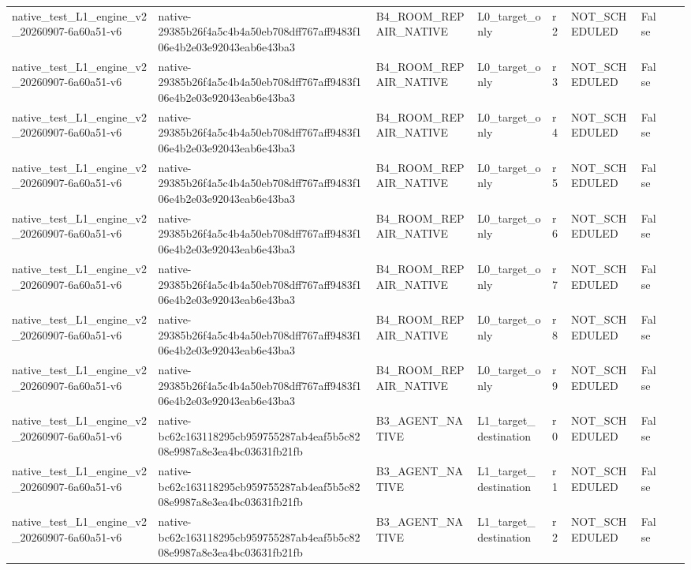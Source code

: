 \begin{tabular}{lllllllll}
native\_test\_L1\_engine\_v2\_20260907-6a60a51-v6 & native-29385b26f4a5c4b4a50eb708dff767aff9483f106e4b2e03e92043eab6e43ba3 & B4\_ROOM\_REPAIR\_NATIVE & L0\_target\_only & r2 & NOT\_SCHEDULED & False &  &  \\
native\_test\_L1\_engine\_v2\_20260907-6a60a51-v6 & native-29385b26f4a5c4b4a50eb708dff767aff9483f106e4b2e03e92043eab6e43ba3 & B4\_ROOM\_REPAIR\_NATIVE & L0\_target\_only & r3 & NOT\_SCHEDULED & False &  &  \\
native\_test\_L1\_engine\_v2\_20260907-6a60a51-v6 & native-29385b26f4a5c4b4a50eb708dff767aff9483f106e4b2e03e92043eab6e43ba3 & B4\_ROOM\_REPAIR\_NATIVE & L0\_target\_only & r4 & NOT\_SCHEDULED & False &  &  \\
native\_test\_L1\_engine\_v2\_20260907-6a60a51-v6 & native-29385b26f4a5c4b4a50eb708dff767aff9483f106e4b2e03e92043eab6e43ba3 & B4\_ROOM\_REPAIR\_NATIVE & L0\_target\_only & r5 & NOT\_SCHEDULED & False &  &  \\
native\_test\_L1\_engine\_v2\_20260907-6a60a51-v6 & native-29385b26f4a5c4b4a50eb708dff767aff9483f106e4b2e03e92043eab6e43ba3 & B4\_ROOM\_REPAIR\_NATIVE & L0\_target\_only & r6 & NOT\_SCHEDULED & False &  &  \\
native\_test\_L1\_engine\_v2\_20260907-6a60a51-v6 & native-29385b26f4a5c4b4a50eb708dff767aff9483f106e4b2e03e92043eab6e43ba3 & B4\_ROOM\_REPAIR\_NATIVE & L0\_target\_only & r7 & NOT\_SCHEDULED & False &  &  \\
native\_test\_L1\_engine\_v2\_20260907-6a60a51-v6 & native-29385b26f4a5c4b4a50eb708dff767aff9483f106e4b2e03e92043eab6e43ba3 & B4\_ROOM\_REPAIR\_NATIVE & L0\_target\_only & r8 & NOT\_SCHEDULED & False &  &  \\
native\_test\_L1\_engine\_v2\_20260907-6a60a51-v6 & native-29385b26f4a5c4b4a50eb708dff767aff9483f106e4b2e03e92043eab6e43ba3 & B4\_ROOM\_REPAIR\_NATIVE & L0\_target\_only & r9 & NOT\_SCHEDULED & False &  &  \\
native\_test\_L1\_engine\_v2\_20260907-6a60a51-v6 & native-bc62c163118295cb959755287ab4eaf5b5c8208e9987a8e3ea4bc03631fb21fb & B3\_AGENT\_NATIVE & L1\_target\_destination & r0 & NOT\_SCHEDULED & False &  &  \\
native\_test\_L1\_engine\_v2\_20260907-6a60a51-v6 & native-bc62c163118295cb959755287ab4eaf5b5c8208e9987a8e3ea4bc03631fb21fb & B3\_AGENT\_NATIVE & L1\_target\_destination & r1 & NOT\_SCHEDULED & False &  &  \\
native\_test\_L1\_engine\_v2\_20260907-6a60a51-v6 & native-bc62c163118295cb959755287ab4eaf5b5c8208e9987a8e3ea4bc03631fb21fb & B3\_AGENT\_NATIVE & L1\_target\_destination & r2 & NOT\_SCHEDULED & False &  &  \\

\end{tabular}

